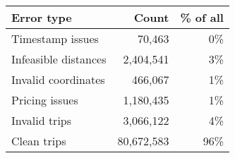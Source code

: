 \begin{tabular}{lrr}
\toprule
Error type & Count & \% of all \\
\midrule
Timestamp issues & 70,463 & 0\% \\
Infeasible distances & 2,404,541 & 3\% \\
Invalid coordinates & 466,067 & 1\% \\
Pricing issues & 1,180,435 & 1\% \\
\midrule
Invalid trips & 3,066,122 & 4\% \\
Clean trips & 80,672,583 & 96\% \\
\bottomrule
\end{tabular}
